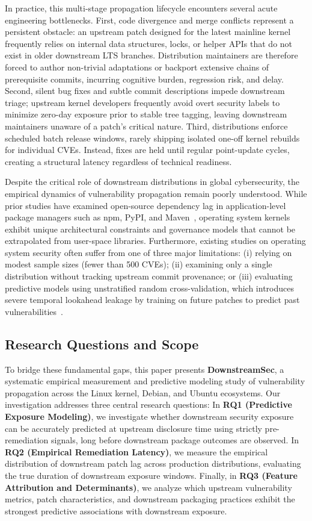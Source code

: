 \documentclass[final,5p,times,twocolumn]{elsarticle}
\begin{document}
In practice, this multi-stage propagation lifecycle encounters several acute engineering bottlenecks. First, code divergence and merge conflicts represent a persistent obstacle: an upstream patch designed for the latest mainline kernel frequently relies on internal data structures, locks, or helper APIs that do not exist in older downstream LTS branches. Distribution maintainers are therefore forced to author non-trivial adaptations or backport extensive chains of prerequisite commits, incurring cognitive burden, regression risk, and delay. Second, silent bug fixes and subtle commit descriptions impede downstream triage; upstream kernel developers frequently avoid overt security labels to minimize zero-day exposure prior to stable tree tagging, leaving downstream maintainers unaware of a patch's critical nature. Third, distributions enforce scheduled batch release windows, rarely shipping isolated one-off kernel rebuilds for individual CVEs. Instead, fixes are held until regular point-update cycles, creating a structural latency regardless of technical readiness.

Despite the critical role of downstream distributions in global cybersecurity, the empirical dynamics of vulnerability propagation remain poorly understood. While prior studies have examined open-source dependency lag in application-level package managers such as npm, PyPI, and Maven~\citep{alfadel2021empirical, kula2018empirical, pashchenko2020vulnerable}, operating system kernels exhibit unique architectural constraints and governance models that cannot be extrapolated from user-space libraries. Furthermore, existing studies on operating system security often suffer from one of three major limitations: (i) relying on modest sample sizes (fewer than 500 CVEs); (ii) examining only a single distribution without tracking upstream commit provenance; or (iii) evaluating predictive models using unstratified random cross-validation, which introduces severe temporal lookahead leakage by training on future patches to predict past vulnerabilities~\citep{zimmermann2010predicting}.

\subsection{Research Questions and Scope}
To bridge these fundamental gaps, this paper presents \textbf{DownstreamSec}, a systematic empirical measurement and predictive modeling study of vulnerability propagation across the Linux kernel, Debian, and Ubuntu ecosystems. Our investigation addresses three central research questions:
In \textbf{RQ1 (Predictive Exposure Modeling)}, we investigate whether downstream security exposure can be accurately predicted at upstream disclosure time using strictly pre-remediation signals, long before downstream package outcomes are observed.
In \textbf{RQ2 (Empirical Remediation Latency)}, we measure the empirical distribution of downstream patch lag across production distributions, evaluating the true duration of downstream exposure windows.
Finally, in \textbf{RQ3 (Feature Attribution and Determinants)}, we analyze which upstream vulnerability metrics, patch characteristics, and downstream packaging practices exhibit the strongest predictive associations with downstream exposure.
\end{document}
